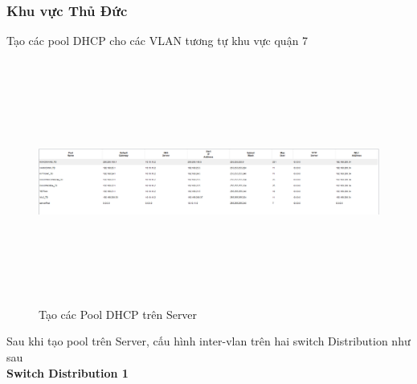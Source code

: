 \documentclass[a4paper, 12pt]{article}
\begin{document}
\subsubsection{Khu vực Thủ Đức}
\hspace*{0.25cm}Tạo các pool DHCP cho các VLAN tương tự khu vực quận 7\\
\begin{figure}[H]
    \centering
    \includegraphics[width=16cm, height=8cm]{img/472.png}
    \caption{Tạo các Pool DHCP trên Server}
    \label{hinh472}
\end{figure}
\hspace*{0.25cm}Sau khi tạo pool trên Server, cấu hình inter-vlan trên hai switch Distribution như sau\\
\hspace*{1cm}\textbf{Switch Distribution 1}\\
\end{document}
